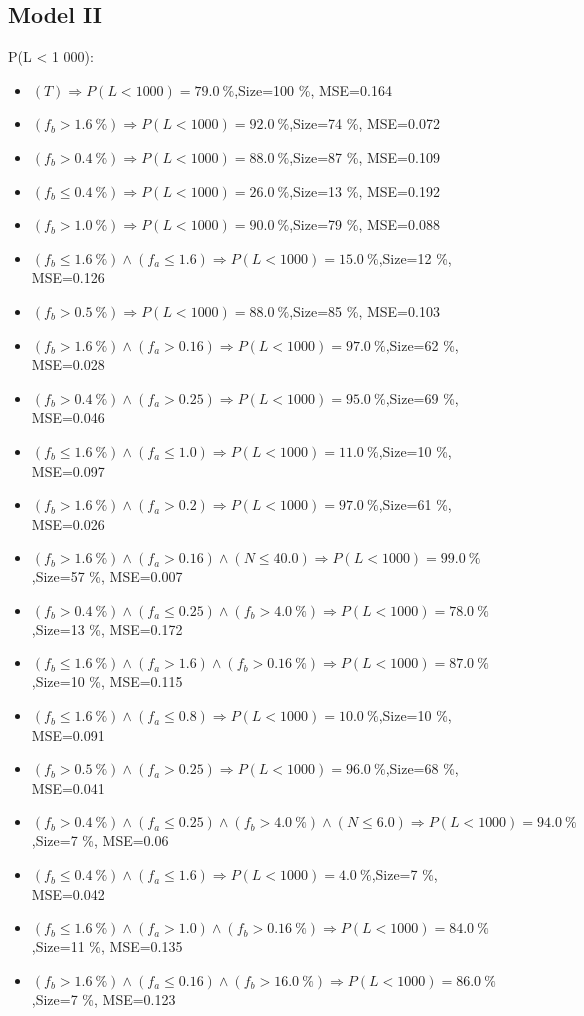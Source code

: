 \documentclass[numbered]{CSL}
\begin{document}
\subsection{Model II}
P(L < 1 000):
\begin{itemize}
\item $(T) \Rightarrow P(L < 1 000) = 79.0~\%$,\hfill Size=100 \%, MSE=0.164
\item $(f_b > 1.6~\%) \Rightarrow P(L < 1 000) = 92.0~\%$,\hfill Size=74 \%, MSE=0.072
\item $(f_b > 0.4~\%) \Rightarrow P(L < 1 000) = 88.0~\%$,\hfill Size=87 \%, MSE=0.109
\item $(f_b \leq 0.4~\%) \Rightarrow P(L < 1 000) = 26.0~\%$,\hfill Size=13 \%, MSE=0.192
\item $(f_b > 1.0~\%) \Rightarrow P(L < 1 000) = 90.0~\%$,\hfill Size=79 \%, MSE=0.088
\item $(f_b \leq 1.6~\%) \land (f_a \leq 1.6) \Rightarrow P(L < 1 000) = 15.0~\%$,\hfill Size=12 \%, MSE=0.126
\item $(f_b > 0.5~\%) \Rightarrow P(L < 1 000) = 88.0~\%$,\hfill Size=85 \%, MSE=0.103
\item $(f_b > 1.6~\%) \land (f_a > 0.16) \Rightarrow P(L < 1 000) = 97.0~\%$,\hfill Size=62 \%, MSE=0.028
\item $(f_b > 0.4~\%) \land (f_a > 0.25) \Rightarrow P(L < 1 000) = 95.0~\%$,\hfill Size=69 \%, MSE=0.046
\item $(f_b \leq 1.6~\%) \land (f_a \leq 1.0) \Rightarrow P(L < 1 000) = 11.0~\%$,\hfill Size=10 \%, MSE=0.097
\item $(f_b > 1.6~\%) \land (f_a > 0.2) \Rightarrow P(L < 1 000) = 97.0~\%$,\hfill Size=61 \%, MSE=0.026
\item $(f_b > 1.6~\%) \land (f_a > 0.16) \land (N \leq 40.0) \Rightarrow P(L < 1 000) = 99.0~\%$,\hfill Size=57 \%, MSE=0.007
\item $(f_b > 0.4~\%) \land (f_a \leq 0.25) \land (f_b > 4.0~\%) \Rightarrow P(L < 1 000) = 78.0~\%$,\hfill Size=13 \%, MSE=0.172
\item $(f_b \leq 1.6~\%) \land (f_a > 1.6) \land (f_b > 0.16~\%) \Rightarrow P(L < 1 000) = 87.0~\%$,\hfill Size=10 \%, MSE=0.115
\item $(f_b \leq 1.6~\%) \land (f_a \leq 0.8) \Rightarrow P(L < 1 000) = 10.0~\%$,\hfill Size=10 \%, MSE=0.091
\item $(f_b > 0.5~\%) \land (f_a > 0.25) \Rightarrow P(L < 1 000) = 96.0~\%$,\hfill Size=68 \%, MSE=0.041
\item $(f_b > 0.4~\%) \land (f_a \leq 0.25) \land (f_b > 4.0~\%) \land (N \leq 6.0) \Rightarrow P(L < 1 000) = 94.0~\%$,\hfill Size=7 \%, MSE=0.06
\item $(f_b \leq 0.4~\%) \land (f_a \leq 1.6) \Rightarrow P(L < 1 000) = 4.0~\%$,\hfill Size=7 \%, MSE=0.042
\item $(f_b \leq 1.6~\%) \land (f_a > 1.0) \land (f_b > 0.16~\%) \Rightarrow P(L < 1 000) = 84.0~\%$,\hfill Size=11 \%, MSE=0.135
\item $(f_b > 1.6~\%) \land (f_a \leq 0.16) \land (f_b > 16.0~\%) \Rightarrow P(L < 1 000) = 86.0~\%$,\hfill Size=7 \%, MSE=0.123
\end{itemize}
\end{document}
